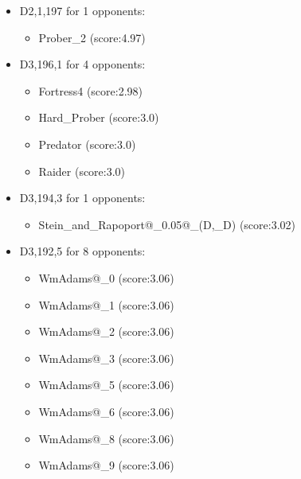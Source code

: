\begin{appendices}
\begin{itemize}
        \item D2,1,197 for 1 opponents:
        \begin{multicols}{3}
            \begin{itemize}
                \item Prober\_2 (score:4.97)
            \end{itemize}
        \end{multicols}

        \item D3,196,1 for 4 opponents:
        \begin{multicols}{3}
            \begin{itemize}
                \item Fortress4 (score:2.98)
                \item Hard\_Prober (score:3.0)
                \item Predator (score:3.0)
                \item Raider (score:3.0)
            \end{itemize}
        \end{multicols}

        \item D3,194,3 for 1 opponents:
        \begin{multicols}{3}
            \begin{itemize}
                \item Stein\_and\_Rapoport@\_0.05@\_(D,\_D) (score:3.02)
            \end{itemize}
        \end{multicols}

        \item D3,192,5 for 8 opponents:
        \begin{multicols}{3}
            \begin{itemize}
                \item WmAdams@\_0 (score:3.06)
                \item WmAdams@\_1 (score:3.06)
                \item WmAdams@\_2 (score:3.06)
                \item WmAdams@\_3 (score:3.06)
                \item WmAdams@\_5 (score:3.06)
                \item WmAdams@\_6 (score:3.06)
                \item WmAdams@\_8 (score:3.06)
                \item WmAdams@\_9 (score:3.06)
            \end{itemize}
        \end{multicols}


\end{itemize}
\end{appendices}
